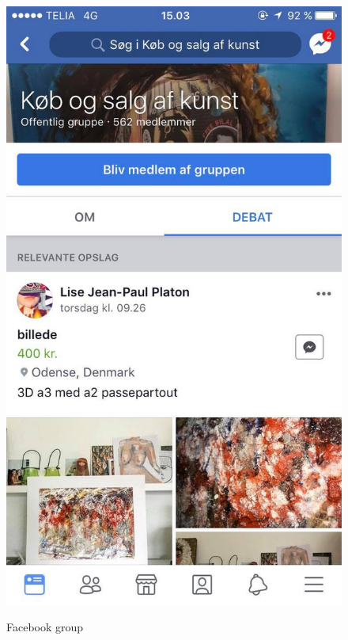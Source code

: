 \begin{figure}[H]
\centering
  \begin{minipage}[b]{0.285\linewidth}
    \caption{\newline Facebook group}
    \includegraphics[width=\linewidth]{Appendix/ScreenshotsCompetitorsPlatforms/facebook.jpg}
    \label{FacebookGroup}
  \end{minipage}
  \hspace{0.6cm}
  \begin{minipage}[b]{0.285\linewidth}

\end{minipage}
\end{figure}
